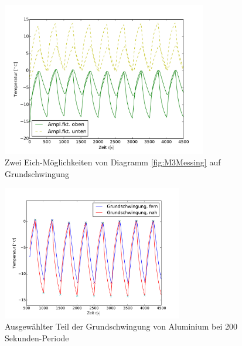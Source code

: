\begin{figure}[h]
	\label{fig:M3AluNorm}
	\centering
	\includegraphics[width=0.8\textwidth]{Bilder/Normierungsauswahl/M3_Messing_norm.pdf}
	\caption{Zwei Eich-Möglichkeiten von Diagramm \ref{fig:M3Messing} auf Grundschwingung}
\end{figure}
\begin{figure}[h]
	\label{fig:M3AluNormkurve}
	\centering
	\includegraphics[width=0.7\textwidth]{Bilder/M3_Alu_norm.pdf}
	\caption{Ausgewählter Teil der Grundschwingung von Aluminium bei 200 Sekunden-Periode}
\end{figure}
